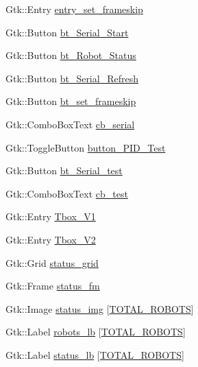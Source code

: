 \begin{DoxyCompactItemize}
\item 
Gtk\+::\+Entry \hyperlink{class_control_g_u_i_a108e4158252832d9f53570b9c21b8ced}{entry\+\_\+set\+\_\+frameskip}
\item 
Gtk\+::\+Button \hyperlink{class_control_g_u_i_ae4c22e835b13a173a02ef4514b28c7f1}{bt\+\_\+\+Serial\+\_\+\+Start}
\item 
Gtk\+::\+Button \hyperlink{class_control_g_u_i_aa41e46c34d55d0d4c7b53ed2fa14deb8}{bt\+\_\+\+Robot\+\_\+\+Status}
\item 
Gtk\+::\+Button \hyperlink{class_control_g_u_i_a391e47311e2e097bf551726b1df5d794}{bt\+\_\+\+Serial\+\_\+\+Refresh}
\item 
Gtk\+::\+Button \hyperlink{class_control_g_u_i_a7cfe9a6fc63a33ccd1f89fb98315340c}{bt\+\_\+set\+\_\+frameskip}
\item 
Gtk\+::\+Combo\+Box\+Text \hyperlink{class_control_g_u_i_a730f792c7de4d8c3cd4c933876d8bc52}{cb\+\_\+serial}
\item 
Gtk\+::\+Toggle\+Button \hyperlink{class_control_g_u_i_a3e71e5f6e11ffd2ab7a206988ef8d7bb}{button\+\_\+\+P\+I\+D\+\_\+\+Test}
\item 
Gtk\+::\+Button \hyperlink{class_control_g_u_i_a877559405ad1764d83748016a0f09d94}{bt\+\_\+\+Serial\+\_\+test}
\item 
Gtk\+::\+Combo\+Box\+Text \hyperlink{class_control_g_u_i_a93ab5972cf38d2cf8431cb375abc56e6}{cb\+\_\+test}
\item 
Gtk\+::\+Entry \hyperlink{class_control_g_u_i_a8c9b9a41a7ac7de9a7c1c323f70e43b4}{Tbox\+\_\+\+V1}
\item 
Gtk\+::\+Entry \hyperlink{class_control_g_u_i_ad4ec00b7d15236b0b8e6723e115c190a}{Tbox\+\_\+\+V2}
\item 
Gtk\+::\+Grid \hyperlink{class_control_g_u_i_a9540bafb29ed9fb1c563a92a65617f10}{status\+\_\+grid}
\item 
Gtk\+::\+Frame \hyperlink{class_control_g_u_i_a848cb9908ed55ec6d3ef9676d5c1dea6}{status\+\_\+fm}
\item 
Gtk\+::\+Image \hyperlink{class_control_g_u_i_ac62b21acfde0d36a37b9838a00432295}{status\+\_\+img} \mbox{[}\hyperlink{class_control_g_u_i_a5a2c1a15c09444b56794705721ba73fa}{T\+O\+T\+A\+L\+\_\+\+R\+O\+B\+O\+TS}\mbox{]}
\item 
Gtk\+::\+Label \hyperlink{class_control_g_u_i_afc2b8ff626fa4298d6901807a7dfccf9}{robots\+\_\+lb} \mbox{[}\hyperlink{class_control_g_u_i_a5a2c1a15c09444b56794705721ba73fa}{T\+O\+T\+A\+L\+\_\+\+R\+O\+B\+O\+TS}\mbox{]}
\item 
Gtk\+::\+Label \hyperlink{class_control_g_u_i_a99da3a90036061b9ab84323de2ae3bcf}{status\+\_\+lb} \mbox{[}\hyperlink{class_control_g_u_i_a5a2c1a15c09444b56794705721ba73fa}{T\+O\+T\+A\+L\+\_\+\+R\+O\+B\+O\+TS}\mbox{]}

\end{DoxyCompactItemize}
